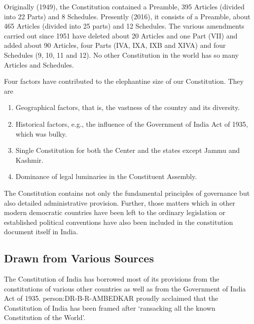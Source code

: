 Originally (1949), the Constitution contained a Preamble, 395 Articles (divided into 22 Parts) and 8 Schedules. Presently (2016), it consists of a Preamble, about 465 Articles (divided into 25 parts) and 12 Schedules. The various amendments carried out since 1951 have deleted about 20 Articles and one Part (VII) and added about 90 Articles, four Parts (IVA, IXA, IXB and XIVA) and four Schedules (9, 10, 11 and 12). No other Constitution in the world has so many Articles and Schedules.

Four factors have contributed to the elephantine size of our Constitution. They are

\renewcommand{\labelenumi}{\textbf{(\alph{enumi})}}
\begin{enumerate}
  \item Geographical factors, that is, the vastness of the country and its diversity.
  \item Historical factors, e.g., the influence of the Government of India Act of 1935, which was bulky.
  \item Single Constitution for both the Center and the states except Jammu and Kashmir.
  \item Dominance of legal luminaries in the Constituent Assembly.
\end{enumerate}

The Constitution contains not only the fundamental principles of governance but also detailed administrative provision. Further, those matters which in other modern democratic countries have been left to the ordinary legislation or established political conventions have also been included in the constitution document itself in India.

\subsection{Drawn from Various Sources}

The Constitution of India has borrowed most of its provisions from the constitutions of various other countries as well as from the Government of India Act of 1935. \gls{person:DR-B-R-AMBEDKAR} proudly acclaimed that the Constitution of India has been framed after `ransacking all the known Constitution of the World'.

